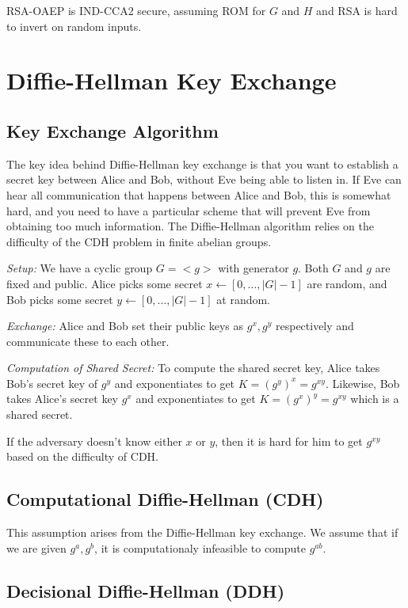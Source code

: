 \documentclass[psamsfonts]{amsart}
\begin{document}
RSA-OAEP is IND-CCA2 secure, assuming ROM for $G$ and $H$ and RSA is hard to invert on random inputs.

\newpage

\section{Diffie-Hellman Key Exchange}

\subsection{Key Exchange Algorithm}

The key idea behind Diffie-Hellman key exchange is that you want to establish a secret key between Alice and Bob, without Eve being able to listen in. If Eve can hear all communication that happens between Alice and Bob, this is somewhat hard, and you need to have a particular scheme that will prevent Eve from obtaining too much information. The Diffie-Hellman algorithm relies on the difficulty of the CDH problem in finite abelian groups.

\emph{Setup:} We have a cyclic group $G = <g>$ with generator $g$. Both $G$ and $g$ are fixed and public. Alice picks some secret $x \leftarrow [0,\ldots,|G|-1]$ are random, and Bob picks some secret $y \leftarrow [0, \ldots, |G|-1]$ at random.

\emph{Exchange:} Alice and Bob set their public keys as $g^x, g^y$ respectively and communicate these to each other.

\emph{Computation of Shared Secret:} To compute the shared secret key, Alice takes Bob's secret key of $g^y$ and exponentiates to get $K = (g^y)^x = g^{xy}$. Likewise, Bob takes Alice's secret key $g^x$ and exponentiates to get $K = (g^x)^y = g^{xy}$ which is a shared secret.

If the adversary doesn't know either $x$ or $y$, then it is hard for him to get $g^{xy}$ based on the difficulty of CDH.

\subsection{Computational Diffie-Hellman (CDH)}

This assumption arises from the Diffie-Hellman key exchange. We assume that if we are given $g^a, g^b$, it is computationaly infeasible to compute $g^{ab}$.

\subsection{Decisional Diffie-Hellman (DDH)}
\end{document}
